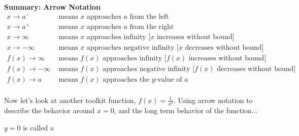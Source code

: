 \documentclass[12pt]{book}
\newcommand{\D}{\displaystyle}
\begin{document}
\begin{boxR}
    \textbf{Summary: Arrow Notation}
    \vspace{1mm}
    \hline
    \vspace{-3mm}
    \begin{align*}
     x \to a^- &\text{ means $x$ approaches $a$ from the left } \\
     x \to a^+ &\text{ means $x$ approaches $a$ from the right } \\
     x \to \infty &\text{ means $x$ approaches infinity [$x$ increases without bound]} \\
     x \to -\infty &\text{ means $x$ approaches negative infinity [$x$ decreases without bound]} \\
     f(x) \to \infty &\text{ means $f(x)$ approaches infinity [$f(x)$ increases without bound]} \\
     f(x) \to -\infty &\text{ means $f(x)$ approaches negative infinity [$f(x)$ decreases without bound]} \\
   f(x) \to a &\text{ means $f(x)$ approaches the $y$-value of $a$ }\\
 \end{align*}  
 \vspace{-18mm}
\end{boxR}

Now let's look at another toolkit function, $\D f(x)=\frac{1}{x^2}$. Using arrow notation to describe the behavior around $x=0$, and the long term behavior of the function...



\vspace{5mm}
$y=0$ is called a 
\vspace{5mm}
\end{document}
